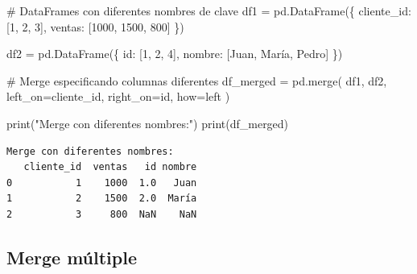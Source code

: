 \documentclass[
  doc,
  floatsintext,
  longtable,
  a4paper,
  nolmodern,
  notxfonts,
  notimes,
  12pt,
  colorlinks=true,linkcolor=blue,citecolor=blue,urlcolor=blue]{apa7}
\newenvironment{Shaded}{\begin{snugshade}}{\end{snugshade}}
\newcommand{\BuiltInTok}[1]{\textcolor[rgb]{0.00,0.23,0.31}{#1}}
\newcommand{\CommentTok}[1]{\textcolor[rgb]{0.37,0.37,0.37}{#1}}
\newcommand{\DecValTok}[1]{\textcolor[rgb]{0.68,0.00,0.00}{#1}}
\newcommand{\NormalTok}[1]{\textcolor[rgb]{0.00,0.23,0.31}{#1}}
\newcommand{\OperatorTok}[1]{\textcolor[rgb]{0.37,0.37,0.37}{#1}}
\newcommand{\StringTok}[1]{\textcolor[rgb]{0.13,0.47,0.30}{#1}}
\begin{document}
\begin{Shaded}
\begin{Highlighting}[]
\CommentTok{\# DataFrames con diferentes nombres de clave}
\NormalTok{df1 }\OperatorTok{=}\NormalTok{ pd.DataFrame(\{}
    \StringTok{\textquotesingle{}cliente\_id\textquotesingle{}}\NormalTok{: [}\DecValTok{1}\NormalTok{, }\DecValTok{2}\NormalTok{, }\DecValTok{3}\NormalTok{],}
    \StringTok{\textquotesingle{}ventas\textquotesingle{}}\NormalTok{: [}\DecValTok{1000}\NormalTok{, }\DecValTok{1500}\NormalTok{, }\DecValTok{800}\NormalTok{]}
\NormalTok{\})}

\NormalTok{df2 }\OperatorTok{=}\NormalTok{ pd.DataFrame(\{}
    \StringTok{\textquotesingle{}id\textquotesingle{}}\NormalTok{: [}\DecValTok{1}\NormalTok{, }\DecValTok{2}\NormalTok{, }\DecValTok{4}\NormalTok{],}
    \StringTok{\textquotesingle{}nombre\textquotesingle{}}\NormalTok{: [}\StringTok{\textquotesingle{}Juan\textquotesingle{}}\NormalTok{, }\StringTok{\textquotesingle{}María\textquotesingle{}}\NormalTok{, }\StringTok{\textquotesingle{}Pedro\textquotesingle{}}\NormalTok{]}
\NormalTok{\})}

\CommentTok{\# Merge especificando columnas diferentes}
\NormalTok{df\_merged }\OperatorTok{=}\NormalTok{ pd.merge(}
\NormalTok{    df1, }
\NormalTok{    df2, }
\NormalTok{    left\_on}\OperatorTok{=}\StringTok{\textquotesingle{}cliente\_id\textquotesingle{}}\NormalTok{,}
\NormalTok{    right\_on}\OperatorTok{=}\StringTok{\textquotesingle{}id\textquotesingle{}}\NormalTok{,}
\NormalTok{    how}\OperatorTok{=}\StringTok{\textquotesingle{}left\textquotesingle{}}
\NormalTok{)}

\BuiltInTok{print}\NormalTok{(}\StringTok{"Merge con diferentes nombres:"}\NormalTok{)}
\BuiltInTok{print}\NormalTok{(df\_merged)}
\end{Highlighting}
\end{Shaded}

\begin{verbatim}
Merge con diferentes nombres:
   cliente_id  ventas   id nombre
0           1    1000  1.0   Juan
1           2    1500  2.0  María
2           3     800  NaN    NaN
\end{verbatim}

\subsection{Merge múltiple}\label{merge-muxfaltiple}
\end{document}
